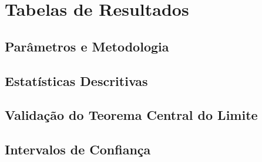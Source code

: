 


\section{Tabelas de Resultados}

\subsection{Parâmetros e Metodologia}


\subsection{Estatísticas Descritivas}




\subsection{Validação do Teorema Central do Limite}


\subsection{Intervalos de Confiança}


